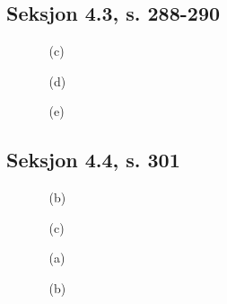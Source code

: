 \documentclass[a4paper, 12pt]{article}  %
\begin{document}
\subsection*{Seksjon 4.3, s. 288-290}
\begin{enumerate}
    \item [\boxed{6}]
    \item [\boxed{12}]
    \item [\boxed{33}]
          \begin{enumerate}
              \item [(c)]
              \item [(d)]
          \end{enumerate}
    \item [\boxed{39}]
          \begin{enumerate}
              \item [(e)]
          \end{enumerate}
    \item [\boxed{49}]
\end{enumerate}

\subsection*{Seksjon 4.4, s. 301}
\begin{enumerate}
    \item [\boxed{5}]
          \begin{enumerate}
              \item [(b)]
              \item [(c)]
          \end{enumerate}
    \item [\boxed{8}]
    \item [\boxed{11}]
          \begin{enumerate}
              \item [(a)]
              \item [(b)]
          \end{enumerate}
\end{enumerate}

\end{document}
